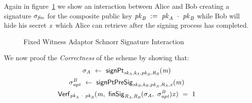 Again in figure~\ref{fig:aptSchnorrInteraction} we show an interaction between Alice and Bob creating a signature $\sigma_{\mathit{fin}}$ for the composite public key $\mathit{pk}_{\mathit{B}} ~:=~ \mathit{pk}_{\mathit{A}} ~\cdot~ \mathit{pk}_{\mathit{B}}$
while Bob will hide his secret $\mathit{x}$ which Alice can retrieve after the signing process has completed.

\begin{figure}
    \caption{Fixed Witness Adaptor Schnorr Signature Interaction}
    \label{fig:aptSchnorrInteraction}
\end{figure}

We now proof the \textit{Correctness} of the scheme by showing that:~
\begin{gather}
    \sigma_{\mathit{A}} ~\leftarrow~ \mathsf{signPt}_{\mathit{sk}_{\mathit{A}},\mathit{\mathit{k}_{\mathit{A}}},\mathit{pk}_{\mathit{B}},\mathit{R}_{\mathit{B}}}(\mathit{m}) \\
    \sigma^{\mathit{B}}_{\mathit{apt}} ~\leftarrow~ \mathsf{signPtPreSig}_{\mathit{sk}_{\mathit{B}},\mathit{\mathit{k}_{\mathit{B}}},\mathit{pk}_{\mathit{A}},\mathit{R}_{\mathit{A}},\mathit{x}}(\mathit{m}) \\
    \mathsf{Verf}_{\mathit{pk}_{\mathit{A}} ~\cdot~ \mathit{pk}_{\mathit{B}}}(\mathit{m} ,~ \mathsf{finSig}_{\mathit{R}_{\mathit{A}},\mathit{R}_{\mathit{B}}}(\sigma_{\mathit{A}} ,~ \sigma^{\mathit{B}}_{\mathit{apt}}){\mathit{x}}) ~=~ 1
\end{gather}

